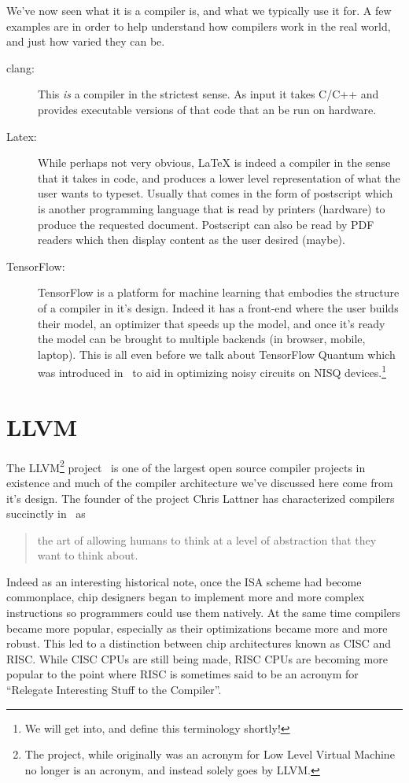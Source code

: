We've now seen what it is a compiler is, and what we typically use it for.
A few examples are in order to help understand how compilers work in the real world, and just how varied they can be.

\begin{description}
    \item[clang:] This \emph{is} a compiler in the strictest sense. As input it takes C/C++ and provides executable versions of that code that an be run on hardware.
    \item[Latex:] While perhaps not very obvious, \LaTeX{} is indeed a compiler in the sense that it takes in code, and produces a lower level representation of what the user wants to typeset. Usually that comes in the form of postscript which is another programming language that is read by printers (hardware) to produce the requested document. Postscript can also be read by PDF readers which then display content as the user desired (maybe).
    \item[TensorFlow:] TensorFlow is a platform for machine learning that embodies the structure of a compiler in it's design. Indeed it has a front-end where the user builds their model, an optimizer that speeds up the model, and once it's ready the model can be brought to multiple backends (in browser, mobile, laptop). This is all even before we talk about TensorFlow Quantum which was introduced in~\cite{tensoflowquantum} to aid in optimizing noisy circuits on \acs{NISQ} devices.\footnote{We will get into, and define this terminology shortly!}
\end{description}

\section{LLVM}\label{sec:llvm}

The LLVM\footnote{The project, while originally was an acronym for Low Level Virtual Machine no longer is an acronym, and instead solely goes by LLVM.} project~\cite{llvm} is one of the largest open source compiler projects in existence and much of the compiler architecture we've discussed here come from it's design.
The founder of the project Chris Lattner has characterized compilers succinctly in~\cite{lattnerquote} as
\begin{quote}
    the art of allowing humans to think at a level of abstraction that they want to think about.
\end{quote}

Indeed as an interesting historical note, once the \ac{ISA} scheme had become commonplace, chip designers began to implement more and more complex instructions so programmers could use them natively.
At the same time compilers became more popular, especially as their optimizations became more and more robust.
This led to a distinction between chip architectures known as \ac{CISC} and \ac{RISC}.
While \ac{CISC} \acp{CPU} are still being made, \ac{RISC} \acp{CPU} are becoming more popular to the point where \ac{RISC} is sometimes said to be an acronym for ``Relegate Interesting Stuff to the Compiler''.

